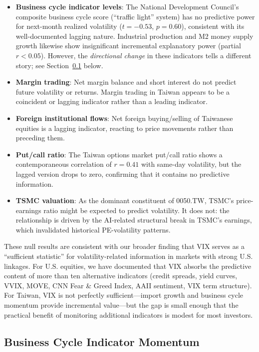 \begin{itemize}
    \item \textbf{Business cycle indicator levels}: The National Development Council's composite business cycle score (``traffic light'' system) has no predictive power for next-month realized volatility ($t = -0.53$, $p = 0.60$), consistent with its well-documented lagging nature. Industrial production and M2 money supply growth likewise show insignificant incremental explanatory power (partial $r < 0.05$). However, the \textit{directional change} in these indicators tells a different story; see Section~\ref{sec:bci_mom} below.
    \item \textbf{Margin trading}: Net margin balance and short interest do not predict future volatility or returns. Margin trading in Taiwan appears to be a coincident or lagging indicator rather than a leading indicator.
    \item \textbf{Foreign institutional flows}: Net foreign buying/selling of Taiwanese equities is a lagging indicator, reacting to price movements rather than preceding them.
    \item \textbf{Put/call ratio}: The Taiwan options market put/call ratio shows a contemporaneous correlation of $r = 0.41$ with same-day volatility, but the lagged version drops to zero, confirming that it contains no predictive information.
    \item \textbf{TSMC valuation}: As the dominant constituent of 0050.TW, TSMC's price-earnings ratio might be expected to predict volatility. It does not: the relationship is driven by the AI-related structural break in TSMC's earnings, which invalidated historical PE-volatility patterns.
\end{itemize}

These null results are consistent with our broader finding that VIX serves as a ``sufficient statistic'' for volatility-related information in markets with strong U.S. linkages. For U.S. equities, we have documented that VIX absorbs the predictive content of more than ten alternative indicators (credit spreads, yield curves, VVIX, MOVE, CNN Fear \& Greed Index, AAII sentiment, VIX term structure). For Taiwan, VIX is not perfectly sufficient---import growth and business cycle momentum provide incremental value---but the gap is small enough that the practical benefit of monitoring additional indicators is modest for most investors.

\subsection{Business Cycle Indicator Momentum}
\label{sec:bci_mom}

